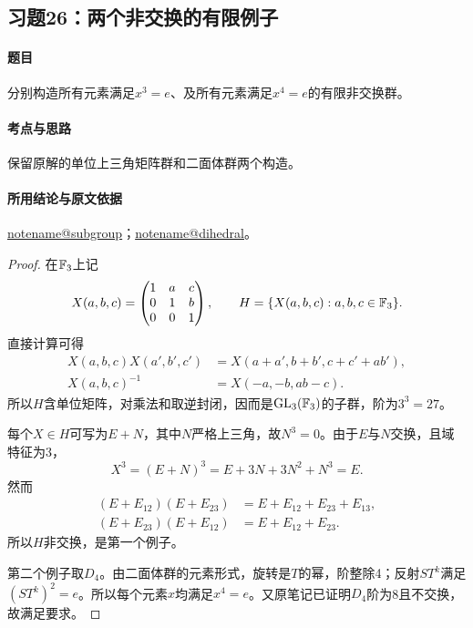 \documentclass[UTF8,a4paper,11pt,fontset=windows]{ctexart}
\makeatletter
\DeclareMathOperator{\GL}{GL}\DeclareMathOperator{\SL}{SL}
\newcommand{\noteref}[1]{\hyperref[note:#1]{\csname notename@#1\endcsname}}
\newcommand{\exref}[2]{\hyperref[ex:#1:#2]{第#1章习题#2}}
\makeatother
\begin{document}
\subsection{习题26：\texorpdfstring{两个非交换的有限例子}{两个非交换的有限例子}}
\label{ex:2:26}

\paragraph{题目}
分别构造所有元素满足$x^3=e$、及所有元素满足$x^4=e$的有限非交换群。

\paragraph{考点与思路}
保留原解的单位上三角矩阵群和二面体群两个构造。

\paragraph{所用结论与原文依据}
\noteref{subgroup}；\noteref{dihedral}。


\begin{proof}
在$\mathbb F_3$上记
\[
X(a,b,c)=\begin{pmatrix}1&a&c\\0&1&b\\0&0&1\end{pmatrix},\qquad
H=\{X(a,b,c):a,b,c\in\mathbb F_3\}.
\]
直接计算可得
\begin{align*}
X(a,b,c)X(a',b',c')&=X(a+a',b+b',c+c'+ab'),\\
X(a,b,c)^{-1}&=X(-a,-b,ab-c).
\end{align*}
所以$H$含单位矩阵，对乘法和取逆封闭，因而是$\GL_3(\F_3)$的子群，阶为$3^3=27$。

每个$X\in H$可写为$E+N$，其中$N$严格上三角，故$N^3=0$。由于$E$与$N$交换，且域特征为3，
\[
X^3=(E+N)^3=E+3N+3N^2+N^3=E.
\]
然而
\begin{align*}
(E+E_{12})(E+E_{23})&=E+E_{12}+E_{23}+E_{13},\\
(E+E_{23})(E+E_{12})&=E+E_{12}+E_{23}.
\end{align*}
所以$H$非交换，是第一个例子。

第二个例子取$D_4$。由二面体群的元素形式，旋转是$T$的幂，阶整除4；反射$ST^k$满足$(ST^k)^2=e$。所以每个元素$x$均满足$x^4=e$。又原笔记已证明$D_4$阶为8且不交换，故满足要求。
\end{proof}
\end{document}

